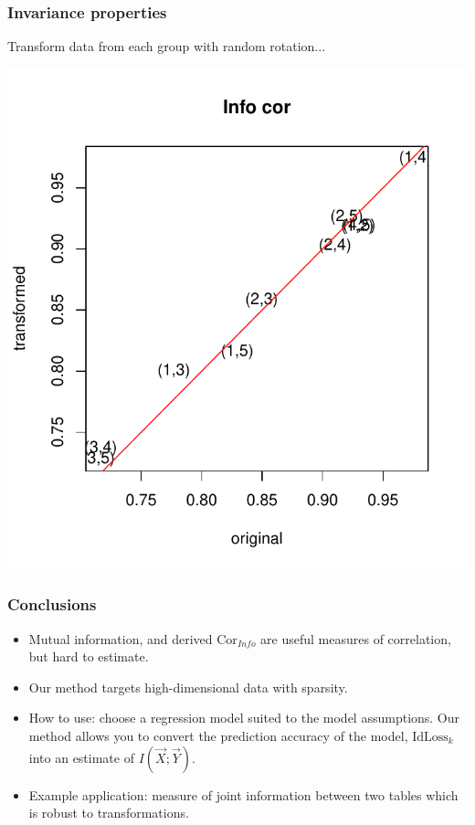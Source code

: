 \documentclass{beamer}
\begin{document}
\begin{frame}
\frametitle{Invariance properties}
Transform data from each group with random rotation...

\begin{center}
\includegraphics[scale = 0.5]{../idloss/info_cor_robustness.pdf}
\end{center}
\end{frame}

\begin{frame}
\frametitle{Conclusions}
\begin{itemize}
\item Mutual information, and derived $\text{Cor}_{Info}$ are useful measures of correlation, but hard to estimate.\pause
\item Our method targets high-dimensional data with sparsity.\pause
\item How to use: choose a regression model suited to the model
  assumptions.  Our method allows you to convert the prediction
  accuracy of the model, $\text{IdLoss}_k$ into an estimate of $I(\vec{X};
  \vec{Y})$.\pause
\item Example application: measure of joint information between two tables which is robust to transformations.
\end{itemize}
\end{frame}
\end{document}
